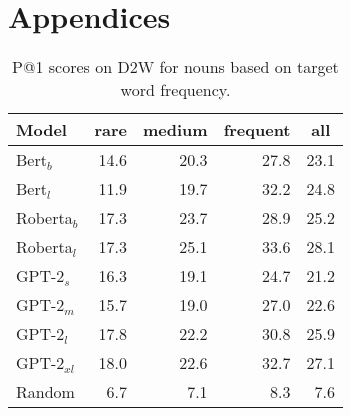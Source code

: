 \documentclass[11pt,a4paper]{article}
\begin{document}
\appendix

\section{Appendices}
\label{sec:appendix}


\begin{table}[h]
    \centering
    \begin{tabular}{l|rrrr}
    \hline
        \textbf{Model} & \multicolumn{1}{c}{\textbf{rare}} & \multicolumn{1}{c}{\textbf{medium}} & \multicolumn{1}{c}{\textbf{frequent}} & \multicolumn{1}{c}{\textbf{all}} \\ \hline
     Bert$_{b}$ & 14.6 & 20.3 & 27.8 & 23.1 \\
     Bert$_{l}$ & 11.9 & 19.7 & 32.2 & 24.8\\
     Roberta$_{b}$ & 17.3 & 23.7 & 28.9 & 25.2 \\
     Roberta$_{l}$ & 17.3 & 25.1 & 33.6 & 28.1 \\ \hline
     GPT-2$_{s}$ & 16.3 & 19.1 & 24.7 & 21.2 \\
     GPT-2$_{m}$ & 15.7 & 19.0 & 27.0 & 22.6 \\
     GPT-2$_{l}$ & 17.8 & 22.2 & 30.8 & 25.9 \\
     GPT-2$_{xl}$ & 18.0 & 22.6 & 32.7 & 27.1 \\ \hline
     Random & 6.7 & 7.1 & 8.3 & 7.6 \\ \hline 
     
    \end{tabular}
    \caption{P@1 scores on D2W for nouns based on target word frequency.}
    \label{tab:freq_results_D2W}
\end{table}


     
\end{document}
